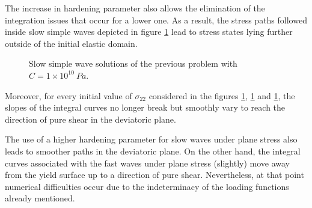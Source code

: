 The increase in hardening parameter also allows the elimination of the integration issues that occur for a lower one.
As a result, the stress paths followed inside slow simple waves depicted in figure \ref{fig:slow_H} lead to stress states lying further outside of the initial elastic domain.
\begin{figure}[h!]
  \centering
  { \label{subfig:slow_H1}}
  { \label{subfig:slow_H2}}
  { \label{subfig:slow_H3}}
  
  \caption{Slow simple wave solutions of the previous problem with $C=1\times10^{10} \: Pa$.}
  \label{fig:slow_H}
\end{figure}
Moreover, for every initial value of $\sigma_{22}$ considered in the figures \ref{fig:slow_H}, \ref{fig:slow_H} and \ref{fig:slow_H}, the slopes of the integral curves no longer break but smoothly vary to reach the direction of pure shear in the deviatoric plane.

\begin{remark}
  The use of a higher hardening parameter for slow waves under plane stress also leads to smoother paths in the deviatoric plane.
  On the other hand, the integral curves associated with the fast waves under plane stress (slightly) move away from the yield surface up to a direction of pure shear.
  Nevertheless, at that point numerical difficulties occur due to the indeterminacy of the loading functions already mentioned.
\end{remark}


